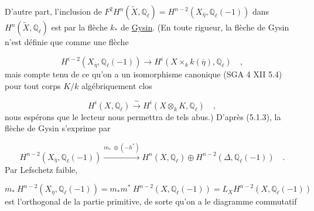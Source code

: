 D'autre part, l'inclusion de $F^2H^n(\widetilde{X},\mathbb{Q}_\ell) = H^{n-2}(X_{\overline{\eta}},\mathbb{Q}_\ell(-1))$ dans $H^n(\widetilde{X},\mathbb{Q}_\ell)$ est par la flèche $k_*$ de \underline{Gysin}. (En toute rigueur, la flèche de Gysin n'est définie que comme une flèche

\begin{equation*}
H^{i-2}(X_{\overline{\eta}},\mathbb{Q}_\ell(-1)) \longrightarrow H^i(X \times_k k(\overline{\eta}),\mathbb{Q}_\ell) \quad ,
\end{equation*}
mais compte tenu de ce qu'on a un isomorphisme canonique (SGA 4 XII 5.4) pour tout corps $K/k$ algébriquement clos

\begin{equation*}
H^i(X,\mathbb{Q}_\ell) \stackrel{\sim}{\longrightarrow} H^i(X \otimes_k K,\mathbb{Q}_\ell) \quad ,
\end{equation*}
nous espérons que le lecteur nous permettra de tels abus.) D'après (5.1.3), la flèche de Gysin s'exprime par

\begin{equation}\tag{5.7.8}
H^{n-2}(X_{\overline{\eta}},\mathbb{Q}_\ell(-1)) \stackrel{m_* \ \oplus(-h^*)}{\longrightarrow} H^n(X,\mathbb{Q}_\ell) \oplus H^{n-2}(\Delta,\mathbb{Q}_\ell(-1)) \quad .
\end{equation}
Par Lefschetz faible,

\begin{equation*}
m_* \ H^{n-2}(X_{\overline{\eta}},\mathbb{Q}_\ell(-1)) = m_*m^* \ H^{n-2}(X,\mathbb{Q}_\ell(-1)) = L_X H^{n-2}(X,\mathbb{Q}_\ell(-1))
\end{equation*}
est l'orthogonal de la partie primitive, de sorte qu'on a le diagramme commutatif

